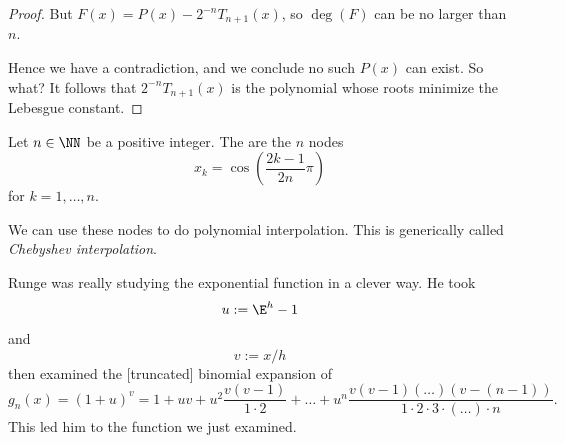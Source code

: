\begin{proof}
  But $F(x) = P(x) - 2^{-n}T_{n+1}(x)$, so $\deg(F)$ can be no larger
  than $n$.

  Hence we have a contradiction, and we conclude no such $P(x)$ can
  exist. So what? It follows that $2^{-n}T_{n+1}(x)$ is the polynomial
  whose roots minimize the Lebesgue constant.
\end{proof}

\begin{defn}
  Let $n\in\NN$ be a positive integer.
  The  are the $n$ nodes
  \begin{equation}
    x_{k} = \cos\left(\frac{2k - 1}{2n}\pi\right)
  \end{equation}
  for $k=1,\dots,n$.
\end{defn}

\begin{rmk}
  We can use these nodes to do polynomial interpolation. This is
  generically called \emph{Chebyshev interpolation}.
\end{rmk}

\begin{rmk}[History]
  Runge was really studying the exponential function in a clever way. He took
  \begin{equation}
    u := \E^{h}-1
  \end{equation}
  and
  \begin{equation}
    v := x/h
  \end{equation}
  then examined the [truncated] binomial expansion of
  \begin{equation}
    g_{n}(x) = (1 + u)^{v} = 1 + uv + u^{2}\frac{v(v-1)}{1\cdot 2}
    +\dots+u^{n}\frac{v(v-1)(\dots)(v-(n-1))}{1\cdot2\cdot3\cdot(\dots)\cdot n}.
  \end{equation}
  This led him to the function we just examined.
\end{rmk}